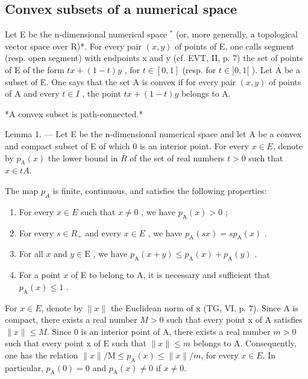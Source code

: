 \subsection{Convex subsets of a numerical space}

Let E be the n-dimensional numerical space \(^{*}\) (or, more generally, a topological vector space over R)*. For every pair \((x,y)\) of points of E, one calls segment (resp. open segment) with endpoints x and y (cf. EVT, II, p. 7) the set of points of E of the form \(tx + (1-t)y\) , for \(t \in [0,1]\) (resp. for \(t \in ]0,1[\) ). Let A be a subset of E. One says that the set A is convex if for every pair \((x,y)\) of points of A and every \(t \in I\) , the point \(tx + (1-t)y\) belongs to A.

*A convex subset is path-connected.*

Lemma 1. --- Let E be the n-dimensional numerical space and let A be a convex and compact subset of E of which 0 is an interior point. For every \(x \in E\), denote by \(p_{\mathrm{A}}(x)\) the lower bound in \(\overline{R}\) of the set of real numbers \(t > 0\) such that \(x \in tA\).

The map \(p_{A}\) is finite, continuous, and satisfies the following properties:

\begin{enumerate}
\def\labelenumi{(\roman{enumi})}
\item
  For every \(x \in E\) such that \(x \neq 0\) , we have \(p_{\mathrm{A}}(x) > 0\) ;
\item
  For every \(s \in R_{+}\) and every \(x \in E\) , we have \(p_{\mathrm{A}}(sx) = sp_{\mathrm{A}}(x)\) .
\item
  For all \(x\) and \(y \in \mathrm{E}\) , we have \(p_{\mathrm{A}}(x + y) \leqslant p_{\mathrm{A}}(x) + p_{\mathrm{A}}(y)\) .
\item
  For a point \(x\) of E to belong to A, it is necessary and sufficient that \(p_{\mathrm{A}}(x) \leqslant 1\) .
\end{enumerate}

For \(x \in E\), denote by \(\|x\|\) the Euclidean norm of x (TG, VI, p. 7). Since A is compact, there exists a real number \(M > 0\) such that every point x of A satisfies \(\|x\| \leqslant M\). Since 0 is an interior point of A, there exists a real number \(m > 0\) such that every point x of E such that \(\|x\| \leqslant m\) belongs to A. Consequently, one has the relation \(\|x\|/\mathrm{M} \leqslant p_{\mathrm{A}}(x) \leqslant \|x\|/m\), for every \(x \in E\). In particular, \(p_{\mathrm{A}}(0) = 0\) and \(p_{\mathrm{A}}(x) \neq 0\) if \(x \neq 0\).

